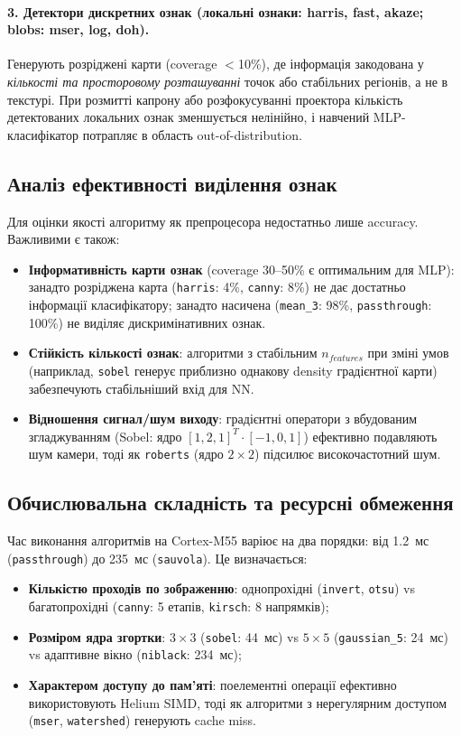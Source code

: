 \documentclass[a4paper,12pt]{article}
\begin{document}
\paragraph{3. Детектори дискретних ознак (локальні ознаки: harris, fast, akaze; blobs: mser, log, doh).}
Генерують розріджені карти (coverage $<$10\%), де інформація закодована у \emph{кількості та просторовому розташуванні} точок або стабільних регіонів, а не в текстурі. При розмитті капрону або розфокусуванні проектора кількість детектованих локальних ознак зменшується нелінійно, і навчений MLP-класифікатор потрапляє в область out-of-distribution.

\subsection{Аналіз ефективності виділення ознак}

Для оцінки якості алгоритму як препроцесора недостатньо лише accuracy. Важливими є також:

\begin{itemize}
	\item \textbf{Інформативність карти ознак} (coverage 30--50\% є оптимальним для MLP): занадто розріджена карта (\texttt{harris}: 4\%, \texttt{canny}: 8\%) не дає достатньо інформації класифікатору; занадто насичена (\texttt{mean\_3}: 98\%, \texttt{passthrough}: 100\%) не виділяє дискримінативних ознак.
	\item \textbf{Стійкість кількості ознак}: алгоритми з стабільним $n_{features}$ при зміні умов (наприклад, \texttt{sobel} генерує приблизно однакову density градієнтної карти) забезпечують стабільніший вхід для NN.
	\item \textbf{Відношення сигнал/шум виходу}: градієнтні оператори з вбудованим згладжуванням (Sobel: ядро $[1,2,1]^T \cdot [-1,0,1]$) ефективно подавляють шум камери, тоді як \texttt{roberts} (ядро $2\times2$) підсилює високочастотний шум.
\end{itemize}

\subsection{Обчислювальна складність та ресурсні обмеження}

Час виконання алгоритмів на Cortex-M55 варіює на два порядки: від 1.2~мс (\texttt{passthrough}) до 235~мс (\texttt{sauvola}). Це визначається:
\begin{itemize}
	\item \textbf{Кількістю проходів по зображенню}: однопрохідні (\texttt{invert}, \texttt{otsu}) vs багатопрохідні (\texttt{canny}: 5 етапів, \texttt{kirsch}: 8 напрямків);
	\item \textbf{Розміром ядра згортки}: $3\times3$ (\texttt{sobel}: 44~мс) vs $5\times5$ (\texttt{gaussian\_5}: 24~мс) vs адаптивне вікно (\texttt{niblack}: 234~мс);
	\item \textbf{Характером доступу до пам'яті}: поелементні операції ефективно використовують Helium SIMD, тоді як алгоритми з нерегулярним доступом (\texttt{mser}, \texttt{watershed}) генерують cache miss.
\end{itemize}
\end{document}

